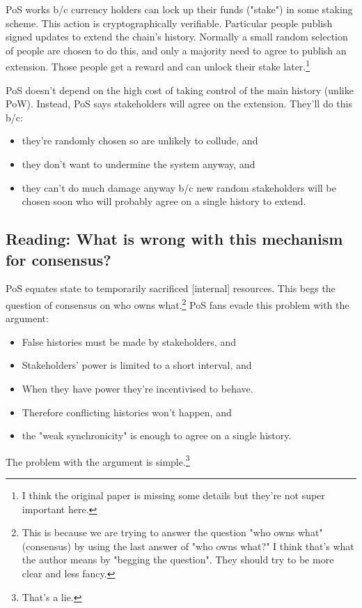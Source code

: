 \documentclass{article}
\begin{document}
PoS works b/c currency holders can lock up their funds ("stake") in some staking scheme. This action is cryptographically verifiable. Particular people publish signed updates to extend the chain's history. Normally a small random selection of people are chosen to do this, and only a majority need to agree to publish an extension. Those people get a reward and can unlock their stake later.\footnote{I think the original paper is missing some details but they're not super important here.}

PoS doesn't depend on the high cost of taking control of the main history (unlike PoW). Instead, PoS says stakeholders will agree on the extension. They'll do this b/c:
\begin{itemize}
    \item they're randomly chosen so are unlikely to collude, and 
    \item they don't want to undermine the system anyway, and
    \item they can't do much damage anyway b/c new random stakeholders will be chosen soon who will probably agree on a single history to extend.
\end{itemize}

\subsection{Reading: What is wrong with this mechanism for consensus?}

PoS equates state to temporarily sacrificed [internal] resources. This begs the question of consensus on who owns what.\footnote{This is because we are trying to answer the question "who owns what" (consensus) by using the last answer of "who owns what?" I think that's what the author means by "begging the question". They should try to be more clear and less fancy.} PoS fans evade this problem with the argument:
\begin{itemize}
    \item False histories must be made by stakeholders, and
    \item Stakeholders' power is limited to a short interval, and
    \item When they have power they're incentivised to behave.
    \item Therefore conflicting histories won't happen, and
    \item the "weak synchronicity" is enough to agree on a single history.
\end{itemize}

The problem with the argument is simple.\footnote{That's a lie.} 
\end{document}
